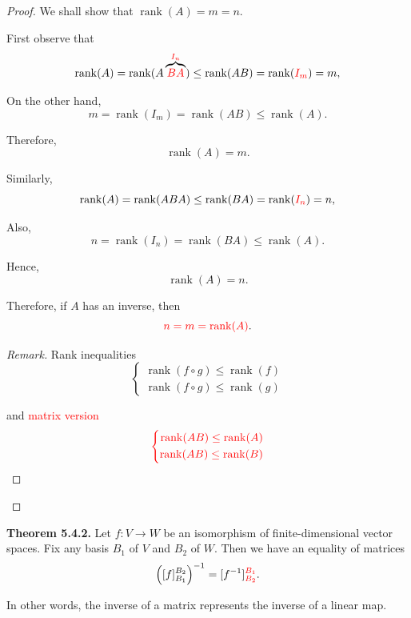 \documentclass[12pt]{article}
\newenvironment{Remark}
{\begin{proof}[Remark]}
{\end{proof}}
\begin{document}
\begin{proof}

We shall show that $\operatorname{rank}(A)=m=n$.

 First observe that
\[
\operatorname{rank}(A)=\operatorname{rank}(A\overbrace{\textcolor{red}{BA}}^{\textcolor{red}{I_n}})\le\operatorname{rank}(AB)=\operatorname{rank}(\textcolor{red}{I_m})=m,
\]

On the other hand,
\[
m=\operatorname{rank}(I_m)=\operatorname{rank}(AB)\le\operatorname{rank}(A).
\]

Therefore,
\[
\operatorname{rank}(A)=m.
\]

\medskip

 Similarly,
\[
\operatorname{rank}(A)=\operatorname{rank}(ABA)\le\operatorname{rank}(BA)=\operatorname{rank}(\textcolor{red}{I_n})=n,
\]

Also,
\[
n=\operatorname{rank}(I_n)=\operatorname{rank}(BA)\le\operatorname{rank}(A).
\]

Hence,
\[
\operatorname{rank}(A)=n.
\]

Therefore, if $A$ has an inverse, then
\[
\textcolor{red}{n=m=\operatorname{rank}(A)}.
\]

\begin{Remark}
Rank inequalities
\[
\left\{   
\begin{aligned}     
\operatorname{rank}(f\circ g)\le\operatorname{rank}(f)\\
\operatorname{rank}(f\circ g)\le\operatorname{rank}(g)
\end{aligned}
\right.  
\]

and \textcolor{red}{matrix version}
\[
\textcolor{red}{
\left\{   
\begin{aligned}     
\operatorname{rank}(AB)\le\operatorname{rank}(A)\\
\operatorname{rank}(AB)\le\operatorname{rank}(B)
\end{aligned}
\right.  
}
\]
\end{Remark}

\end{proof}

\textbf{Theorem 5.4.2.}
Let $f:V\to W$ be an isomorphism of finite-dimensional vector spaces.
Fix any basis \(B_1\) of \(V\) and \(B_2\) of \(W\).
Then we have an equality of matrices
\[
\left([f]_{B_1}^{B_2}\right)^{-1}=[f^{-1}]_{\textcolor{red}{B_2}}^{\textcolor{red}{B_1}}.
\]

In other words, the inverse of a matrix represents the inverse of a linear map.
\end{document}
